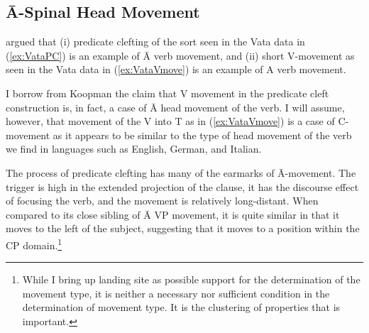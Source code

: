 \documentclass[output=paper,colorlinks,citecolor=brown,
]{langscibook}
\begin{document}
\subsection{\=A-Spinal Head Movement}

\citet{Koopman:1984} argued that (i) predicate clefting of the sort seen in the Vata data in (\ref{ex:VataPC})   is an example of \=A verb movement, and (ii) short V-movement as seen in the Vata data in   (\ref{ex:VataVmove}) is an example of A verb movement.  

\z

\ea \label{ex:VataVmove}
    \z
\z

I borrow from Koopman the claim that V movement in the predicate cleft construction is, in fact, a case of \=A head movement of the verb.  I will assume, however, that movement of the V into T as in (\ref{ex:VataVmove}) is a case of C-movement as it appears to be similar to the type of head movement of the verb we find in languages such as English, German, and Italian.  

The process of predicate clefting has many of the earmarks of \=A-movement.  The trigger is high in the extended projection of the clause, it has the discourse effect of focusing the verb, and the movement is relatively long-distant.  When compared to its close sibling of \=A VP movement, it is quite similar in that it moves to the left of the subject, suggesting that it moves to a position within the CP domain.\footnote{While I bring up landing site as possible support for the determination of the movement type, it is neither a necessary nor sufficient condition in the determination of movement type.  It is the clustering of properties that is important.}
\end{document}
